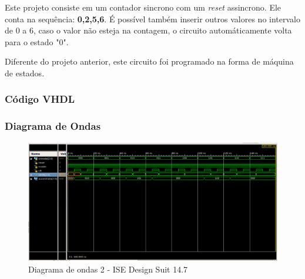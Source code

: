 \documentclass[12pts]{article}
\begin{document}
Este projeto consiste em um contador sincrono com um \textit{reset} assincrono. Ele conta na sequência: \textbf{0,2,5,6}. É possível também inserir outros valores no intervalo de 0 a 6, caso o valor não esteja na contagem, o circuito automáticamente volta para o estado "0". 

Diferente do projeto anterior, este circuito foi programado na forma de máquina de estados.

\subsubsection{Código VHDL}
                                                                                                                                     
\subsubsection{Diagrama de Ondas}
	\begin{figure}[!htb]
	  \centering
	  \includegraphics[scale=0.38]{imagens/onda_projeto_2.png}
	  \caption{Diagrama de ondas 2 - ISE Design Suit 14.7}
	  \label{figRotulo}
	\end{figure}
\end{document}
